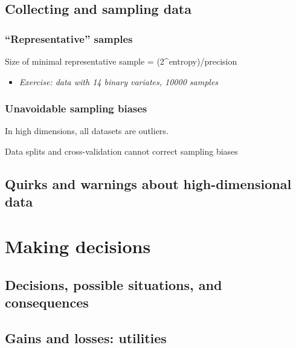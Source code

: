 \documentclass[]{book}
\providecommand{\tightlist}{%
  \setlength{\itemsep}{0pt}\setlength{\parskip}{0pt}}
\begin{document}
\hypertarget{collecting-and-sampling-data}{%
\section{Collecting and sampling data}\label{collecting-and-sampling-data}}

\hypertarget{representative-samples}{%
\subsection{``Representative'' samples}\label{representative-samples}}

Size of minimal representative sample = (2\^{}entropy)/precision

\begin{itemize}
\tightlist
\item
  \emph{Exercise: data with 14 binary variates, 10000 samples}
\end{itemize}

\hypertarget{unavoidable-sampling-biases}{%
\subsection{Unavoidable sampling biases}\label{unavoidable-sampling-biases}}

In high dimensions, all datasets are outliers.

Data splits and cross-validation cannot correct sampling biases

\hypertarget{quirks-and-warnings-about-high-dimensional-data}{%
\section{Quirks and warnings about high-dimensional data}\label{quirks-and-warnings-about-high-dimensional-data}}

\hypertarget{making-decisions}{%
\chapter{Making decisions}\label{making-decisions}}

\hypertarget{decisions-possible-situations-and-consequences}{%
\section{Decisions, possible situations, and consequences}\label{decisions-possible-situations-and-consequences}}

\hypertarget{gains-and-losses-utilities}{%
\section{Gains and losses: utilities}\label{gains-and-losses-utilities}}
\end{document}
